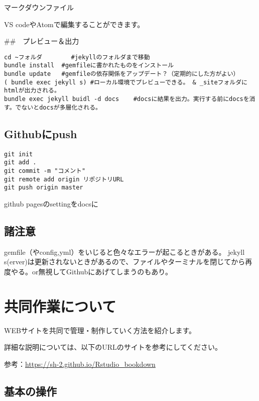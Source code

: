\documentclass[
]{book}
\begin{document}
マークダウンファイル

VS codeやAtomで編集することができます。

\#\#　プレビュー＆出力

\begin{verbatim}
cd ~フォルダ 		#jekyllのフォルダまで移動
bundle install	#gemfileに書かれたものをインストール
bundle update 	#gemfileの依存関係をアップデート？（定期的にした方がよい）
( bundle exec jekyll s)	#ローカル環境でプレビューできる。 & _siteフォルダにhtmlが出力される。
bundle exec jekyll buidl -d docs	#docsに結果を出力。実行する前にdocsを消す。でないとdocsが多層化される。
\end{verbatim}

\hypertarget{githubux306bpush}{%
\section{Githubにpush}\label{githubux306bpush}}

\begin{verbatim}
git init
git add .
git commit -m "コメント"
git remote add origin リポジトリURL
git push origin master
\end{verbatim}

github pagesのsettingをdocsに

\hypertarget{ux8af8ux6ce8ux610f}{%
\section{諸注意}\label{ux8af8ux6ce8ux610f}}

gemfile（やconfig,yml）をいじると色々なエラーが起こるときがある。
jekyll s(erver)は更新されないときがあるので、ファイルやターミナルを閉じてから再度やる。or無視してGithubにあげてしまうのもあり。

\hypertarget{ux5171ux540cux4f5cux696dux306bux3064ux3044ux3066}{%
\chapter{共同作業について}\label{ux5171ux540cux4f5cux696dux306bux3064ux3044ux3066}}

WEBサイトを共同で管理・制作していく方法を紹介します。

詳細な説明については、以下のURLのサイトを参考にしてください。

参考：\url{https://sh-2.github.io/Rstudio_bookdown}

\hypertarget{ux57faux672cux306eux64cdux4f5c}{%
\section{基本の操作}\label{ux57faux672cux306eux64cdux4f5c}}
\end{document}
